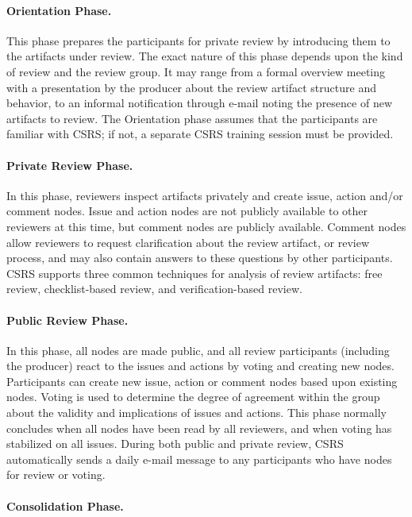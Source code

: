 \paragraph{Orientation Phase.} 

This phase prepares the participants for private review by introducing
them to the artifacts under review.  The exact nature of this phase
depends upon the kind of review and the review group.  It may range
from a formal overview meeting with a presentation by the producer
about the review artifact structure and behavior, to an informal
notification through e-mail noting the presence of new artifacts to
review.  The Orientation phase assumes that the participants are
familiar with CSRS; if not, a separate CSRS training session must be
provided.

\paragraph {Private Review Phase.} 

In this phase, reviewers inspect artifacts privately and create issue,
action and/or comment nodes.  Issue and action nodes are not publicly
available to other reviewers at this time, but comment nodes are
publicly available.  Comment nodes allow reviewers to request
clarification about the review artifact, or review process, and may
also contain answers to these questions by other participants.  CSRS
supports three common techniques for analysis of review artifacts:
free review, checklist-based review, and verification-based review.

\paragraph{Public Review Phase.} 

In this phase, all nodes are made public, and all review participants
(including the producer) react to the issues and actions by voting and
creating new nodes.  Participants can create new issue, action or
comment nodes based upon existing nodes.  Voting is used to determine
the degree of agreement within the group about the validity and
implications of issues and actions.  This phase normally concludes
when all nodes have been read by all reviewers, and when voting has
stabilized on all issues.  During both public and private review, CSRS
automatically sends a daily e-mail message to any participants who
have nodes for review or voting.


\paragraph{Consolidation Phase.} 

